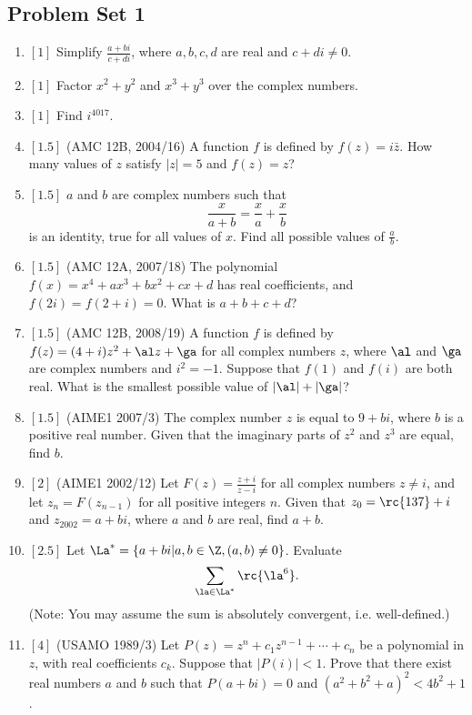 \subsection{Problem Set 1}
\begin{enumerate}
\item $[1]$ Simplify $\frac{a+bi}{c+di}$, where $a,b,c,d$ are real and $ c+di\neq 0$.
\item $[1]$ Factor $x^2+y^2$ and $x^3+y^3$ over the complex numbers.
\item $[1]$ Find $i^{4017}$.
\item $[1.5]$ (AMC 12B, 2004/16) A function $f$ is defined by $f(z)=i\bar z$. How many values of $z$ satisfy $|z|=5$ and $f(z)=z$?
\item $[1.5]$ $a$ and $b$ are complex numbers such that
\[\frac{x}{a+b} = \frac{x}{a} + \frac{x}{b}\]
is an identity, true for all values of $x$. Find all possible values of $\frac{a}{b}$.
\item $[1.5]$ (AMC 12A, 2007/18) The polynomial $f(x)=x^4+ax^3+bx^2+cx+d$ has real coefficients, and $f(2i)=f(2+i)=0$. What is $a+b+c+d$?
\item $[1.5]$ (AMC 12B, 2008/19) A function $f$ is defined by $f(z)=(4+i)z^2+\al z+\ga$ for all complex numbers $z$, where $\al$ and $\ga$ are complex numbers and $i^2=-1$. Suppose that $f(1)$ and $f(i)$ are both real. What is the smallest possible value of $|\al|+|\ga|$?
\item $[1.5]$ (AIME1 2007/3) The complex number $z$ is equal to $9+bi$, where $b$ is a positive real number. Given that the imaginary parts of $z^2$ and $z^3$ are equal, find $b$.
\item $[2]$ (AIME1 2002/12) Let $F(z)=\frac{z+i}{z-i}$ for all complex numbers $z\neq i$, and let $z_n=F(z_{n-1})$ for all positive integers $n$. Given that $z_0=\rc{137}+i$ and $z_{2002}=a+bi$, where $a$ and $b$ are real, find $a+b$.
\item $[2.5]$ Let $\La^*=\{a+bi|a,b\in \Z, (a,b)\neq 0\}$. Evaluate
\[
\sum_{\la\in \La^*}\rc{\la^6}.
\]
(Note: You may assume the sum is absolutely convergent, i.e. well-defined.)
\item $[4]$ (USAMO 1989/3) Let $P(z)=z^n+c_1z^{n-1}+\cdots +c_n$ be a polynomial in $z$, with real coefficients $c_k$. Suppose that $|P(i)|<1$. Prove that there exist real numbers $a$ and $b$ such that $P(a+bi)=0$ and $(a^2+b^2+a)^2<4b^2+1$.
\end{enumerate}
